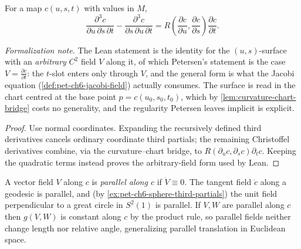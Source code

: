 \begin{lemma}
  \label{lem:pet-ch6-third-partial-commutator}


  For a map $c(u,s,t)$ with values in $M$,
  \[
    \frac{\partial^3c}{\partial u\,\partial s\,\partial t}
    -\frac{\partial^3c}{\partial s\,\partial u\,\partial t}
    =R\!\left(\frac{\partial c}{\partial u},\frac{\partial c}{\partial s}\right)
    \frac{\partial c}{\partial t}.
  \]

  \emph{Formalization note.} The Lean statement is the identity for the
  $(u,s)$-surface with an \emph{arbitrary} $C^2$ field $V$ along it, of which
  Petersen's statement is the case $V=\frac{\partial c}{\partial t}$: the $t$-slot
  enters only through $V$, and the general form is what the Jacobi equation
  (\cref{def:pet-ch6-jacobi-field}) actually consumes. The surface is read in the
  chart centred at the base point $p=c(u_0,s_0,t_0)$, which by
  \cref{lem:curvature-chart-bridge} costs no generality, and the regularity Petersen
  leaves implicit is explicit.
\end{lemma}
\begin{proof}

  \sketch
  Use normal coordinates. Expanding the recursively defined third derivatives cancels ordinary coordinate third partials; the remaining Christoffel derivatives combine, via the curvature--chart bridge, to \(R(\partial_u c,\partial_s c)\partial_t c\). Keeping the quadratic terms instead proves the arbitrary-field form used by Lean.
\end{proof}

\begin{definition}
  \label{def:pet-ch6-parallel-field}


  A vector field $V$ along $c$ is \emph{parallel along $c$} if $\dot V\equiv0$.
  The tangent field $\dot c$ along a geodesic is parallel, and (by
  \cref{ex:pet-ch6-sphere-third-partials}) the unit field perpendicular to a
  great circle in $S^2(1)$ is parallel. If $V,W$ are parallel along $c$ then
  $g(V,W)$ is constant along $c$ by the product rule, so parallel fields neither
  change length nor relative angle, generalizing parallel translation in
  Euclidean space.
\end{definition}

